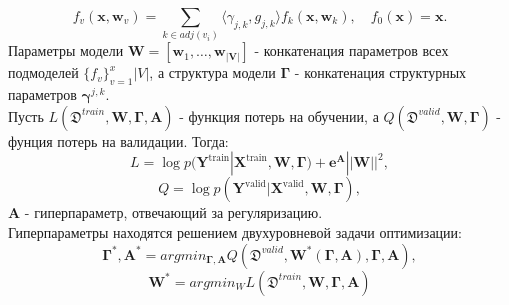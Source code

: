 \documentclass[12pt, twoside]{article}
\begin{document}
	 $$f_{v}(\textbf{x}, \textbf{w}_{v}) = \sum\limits_{k \in adj(v_i)} \langle \gamma_{j, k}, g_{j, k} \rangle f_{k}(\textbf{x}, \textbf{w}_{k}), \quad f_{0}(\textbf{x}) = \textbf{x}.$$ 
	Параметры модели $\mathbf{W}=[\mathbf{w}_1,\dots,\mathbf{w}_\mathbf{|V|}]$ - конкатенация параметров всех подмоделей $\{f_{v}\}_{v = 1}^x{|V|}$, а
	структура модели $\boldsymbol{\Gamma}$ - конкатенация структурных параметров $\boldsymbol{\gamma}^{j,k}$. \\
Пусть $L(\mathfrak{D}^{train},\mathbf{W},\boldsymbol{\Gamma}, \textbf{A})$ - функция потерь на обучении, а $Q(\mathfrak{D}^{valid},\mathbf{W},\boldsymbol{\Gamma})$ - фунция потерь на валидации. Тогда:
$$L =  \log p(\mathbf{Y}^\text{train}|\mathbf{X}^\text{train}, \mathbf{W}, \boldsymbol{\Gamma}) + \boldsymbol{e}^{\mathbf{A}}||\mathbf{W}||^2,$$
$$Q =\log p(\mathbf{Y}^\text{valid}|\mathbf{X}^\text{valid}, \mathbf{W}, \boldsymbol{\Gamma}),
$$
$\mathbf{A}$ - гиперпараметр, отвечающий за регуляризацию. \\
Гиперпараметры находятся решением двухуровневой задачи оптимизации:
$$\boldsymbol{\Gamma^{*}},\mathbf{A^{*}} = argmin_{\boldsymbol{\Gamma},\mathbf{A}} Q(\mathfrak{D}^{valid},\mathbf{W^*(\boldsymbol{\Gamma},\mathbf{A})},\boldsymbol{\Gamma},\mathbf{A}),$$
$$\mathbf{W^*} = argmin_W L(\mathfrak{D}^{train},\mathbf{W},\boldsymbol{\Gamma},\mathbf{A})$$
\end{document}
